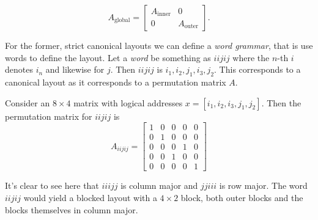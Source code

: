 \documentclass[10pt]{article}
\theoremstyle{remark}
\begin{document}
\[
A_{\text{global}} =
\begin{bmatrix}
A_{\text{inner}}&0\\
0&A_{\text{outer}}
\end{bmatrix}.
\]


For the former, strict canonical layouts we can define a {\it word grammar}, that is use words to define the layout. Let a {\it word} be something as $iijij$ where the $n$-th $i$ denotes $i_n$ and likewise for $j$. Then $iijij$ is $i_1, i_2, j_1, i_3, j_2$. This corresponds to a canonical layout as it corresponds to a permutation matrix $A$.

Consider an $8\times 4$ matrix with logical addresses $x=[i_1, i_2, i_3, j_1, j_2]$. Then the permutation matrix for $iijij$ is
%
\[
A_{iijij} = \begin{bmatrix}
    1 & 0 & 0 & 0 & 0 \\
    0 & 1 & 0 & 0 & 0 \\
    0 & 0 & 0 & 1 & 0 \\
    0 & 0 & 1 & 0 & 0 \\
    0 & 0 & 0 & 0 & 1
\end{bmatrix}
\]

It's clear to see here that $iiijj$ is column major and $jjiii$ is row major.
The word $iijij$ would yield a blocked layout with a $4\times 2$ block, both outer blocks and the blocks themselves in column major.


\end{document}
